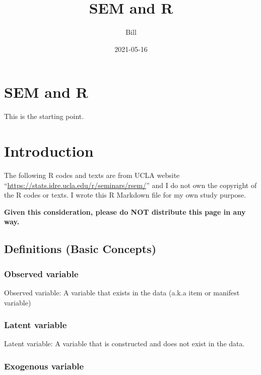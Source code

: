 \documentclass[]{book}
\title{SEM and R}
\author{Bill}
\date{2021-05-16}
\begin{document}
\maketitle

{
\setcounter{tocdepth}{1}
\tableofcontents
}
\hypertarget{sem-and-r}{%
\chapter{SEM and R}\label{sem-and-r}}

This is the starting point.

\hypertarget{intro}{%
\chapter{Introduction}\label{intro}}

The following R codes and texts are from UCLA website ``\url{https://stats.idre.ucla.edu/r/seminars/rsem/}'' and I do not own the copyright of the R codes or texts. I wrote this R Markdown file for my own study purpose.

\textbf{Given this consideration, please do NOT distribute this page in any way.}

\hypertarget{definitions-basic-concepts}{%
\section{Definitions (Basic Concepts)}\label{definitions-basic-concepts}}

\hypertarget{observed-variable}{%
\subsection{Observed variable}\label{observed-variable}}

Observed variable: A variable that exists in the data (a.k.a item or manifest variable)

\hypertarget{latent-variable}{%
\subsection{Latent variable}\label{latent-variable}}

Latent variable: A variable that is constructed and does not exist in the data.

\hypertarget{exogenous-variable}{%
\subsection{Exogenous variable}\label{exogenous-variable}}
\end{document}
